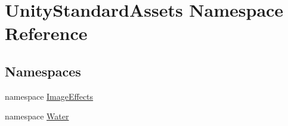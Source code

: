 \hypertarget{namespace_unity_standard_assets}{}\section{Unity\+Standard\+Assets Namespace Reference}
\label{namespace_unity_standard_assets}
\subsection*{Namespaces}
\begin{DoxyCompactItemize}
\item 
namespace \mbox{\hyperlink{namespace_unity_standard_assets_1_1_image_effects}{Image\+Effects}}
\item 
namespace \mbox{\hyperlink{namespace_unity_standard_assets_1_1_water}{Water}}
\end{DoxyCompactItemize}
